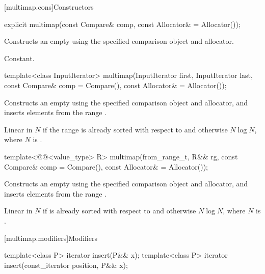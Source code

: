[multimap.cons]{Constructors}

%
\begin{itemdecl}
explicit multimap(const Compare& comp, const Allocator& = Allocator());
\end{itemdecl}

\begin{itemdescr}
\pnum
\effects
Constructs an empty
using the specified comparison object and allocator.

\pnum
\complexity
Constant.
\end{itemdescr}

%
\begin{itemdecl}
template<class InputIterator>
  multimap(InputIterator first, InputIterator last,
           const Compare& comp = Compare(),
           const Allocator& = Allocator());
\end{itemdecl}

\begin{itemdescr}
\pnum
\effects
Constructs an empty
using the specified comparison object and allocator,
and inserts elements from the range
.

\pnum
\complexity
Linear in $N$ if the range
is already sorted with respect to 
and otherwise $N \log N$,
where $N$ is
.
\end{itemdescr}

%
\begin{itemdecl}
template<@@<value_type> R>
  multimap(from_range_t, R&& rg, const Compare& comp = Compare(), const Allocator& = Allocator());
\end{itemdecl}

\begin{itemdescr}
\pnum
\effects
Constructs an empty 
using the specified comparison object and allocator, and
inserts elements from the range .

\pnum
\complexity
Linear in $N$ if  is already sorted with respect to  and
otherwise $N \log N$, where $N$ is .
\end{itemdescr}

[multimap.modifiers]{Modifiers}

%
\begin{itemdecl}
template<class P> iterator insert(P&& x);
template<class P> iterator insert(const_iterator position, P&& x);
\end{itemdecl}

